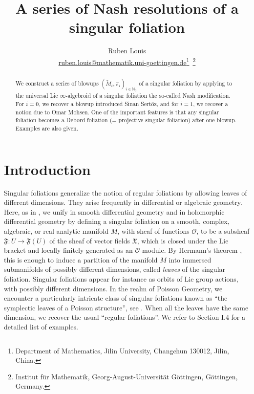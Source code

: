 \documentclass[10pt]{article}
\title{A series of Nash resolutions of a singular foliation}
\author{Ruben Louis\\  \href{ruben.louis@mathematik.uni-goettingen.de}{ruben.louis@mathematik.uni-goettingen.de}\thanks{Department of Mathematics, Jilin University, Changchun 130012, Jilin, China.}~\thanks{Institut f\"ur Mathematik, Georg-August-Universit\"at G\"ottingen, G\"ottingen, Germany.}}
\date{}
\theoremstyle{plain}
\theoremstyle{definition}
\theoremstyle{remark}
\begin{document}
\maketitle

\begin{abstract}
We construct a series of blowups $(\widetilde M_i,\pi_i)_{i\in \mathbb N_0}$ of a singular foliation by applying to the universal Lie $\infty$-algebroid of a singular foliation  %
the so-called Nash modification.
For $i=0$, we recover a blowup introduced Sinan Sertöz, and for $i=1$,  we recover a notion due to Omar Mohsen.  %
One of the important features is that any singular foliation becomes a Debord foliation (= projective singular foliation) after one blowup.
Examples are also given.
\end{abstract}


\tableofcontents

\section*{Introduction}
Singular foliations generalize the notion of regular foliations by allowing leaves of different dimensions. They arise frequently in differential or algebraic geometry. Here, as in \cite{LLL}, we unify \cite{Hermann,AndroulidakisIakovos,AndroulidakisZambon,Cerveau, Debord,LLS} in smooth differential geometry and \cite{zbMATH03423310,Ali-Sinan} in holomorphic differential geometry by defining a singular foliation on a smooth, complex, algebraic, or real analytic manifold $M$,  with sheaf of functions $\mathcal O$, to be a subsheaf $\mathfrak F \colon U\longrightarrow\mathfrak F(U )$ of the sheaf of vector fields $\mathfrak X$, which is closed under the Lie bracket and locally finitely generated as an $\mathcal O$-module. 
By Hermann's theorem \cite{Hermann}, this is enough to induce a partition of the manifold $M$ into {immersed} submanifolds of possibly different dimensions, called \emph{leaves} of the singular foliation. Singular foliations appear for instance as orbits of Lie group actions, with possibly different dimensions.  %
In the realm of Poisson Geometry, we encounter a particularly intricate class of singular foliations known as “the symplectic leaves of a Poisson structure”, see \cite{LPV,CFM}. When all the leaves have the same dimension, we recover the usual \textquotedblleft regular foliations\textquotedblright \cite{DiederichKlas, LLL}. We refer to \cite{LLL} Section I.4 for a detailed list of examples.
\end{document}
